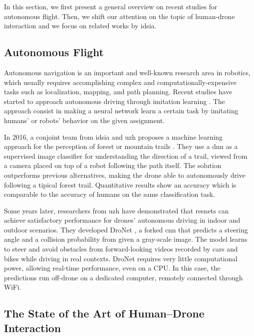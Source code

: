 \medskip

In this section, we first present a general overview on recent studies for autonomous flight. Then, we shift our attention on the topic of human-drone interaction and we focus on related works by \gls{idsia}.



\subsection{Autonomous Flight}
\label{subsec:drone-auto-drive}

Autonomous navigation is an important and well-known research area in robotics, which usually requires accomplishing complex and computationally-expensive tasks such as localization, mapping, and path planning. Recent studies have started to approach autonomous driving through imitation learning \cite{imitation_learning_survey}. The approach consist in making a neural network learn a certain task by imitating humans' or robots' behavior on the given assignment.

\medskip

In 2016, a conjoint team from \gls{idsia} and \gls{uzh} proposes a machine learning approach for the perception of forest or mountain trails \cite{giusti2016machine}. They use a \gls{dnn} as a supervised image classifier for understanding the direction of a trail, viewed from a camera placed on top of a robot following the path itself. The solution outperforms previous alternatives, making the drone able to autonomously drive following a tipical forest trail. Quantitative results show an accuracy which is comparable to the accuracy of humans on the same classification task.

Some years later, researchers from \gls{uzh} have demonstrated that \gls{resnet}s can achieve satisfactory performance for drones' autonomous driving in indoor and outdoor scenarios. They developed DroNet \cite{Loquercio_2018}, a forked \gls{cnn} that predicts a steering angle and a collision probability from given a gray-scale image. The model learns to steer and avoid obstacles from forward-looking videos recorded by cars and bikes while driving in real contexts. DroNet requires very little computational power, allowing real-time performance, even on a CPU. In this case, the predictions run off-drone on a dedicated computer, remotely connected through WiFi.



\clearpage
\subsection{The State of the Art of Human–Drone Interaction}
\label{subsec:human-drone-sota}

